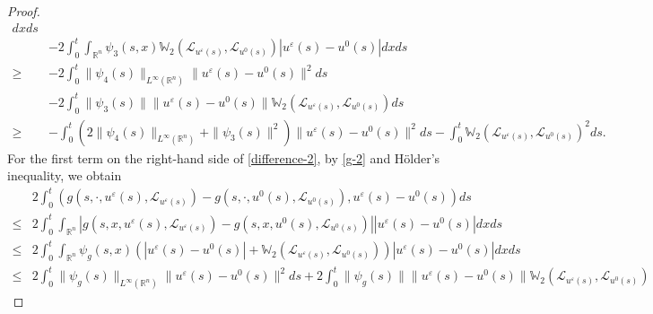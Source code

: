 \documentclass[11pt]{article}
\numberwithin{equation}{section}
\theoremstyle{plain}
\def\geq{\geqslant}
\def\leq{\leqslant}
\begin{document}
\begin{proof}
\begin{align}
        dx ds
        \nonumber \\
        & -2 \int_0^t \int_{\mathbb{R}^n}
        \psi_3(s, x)
        \mathbb{W}_2
        \left(
        \mathcal{L}_{u^\varepsilon(s)},
        \mathcal{L}_{u^0(s)}
        \right)
        | u^\varepsilon(s) - u^0 (s) |
        dx ds
        \nonumber \\
        \geq & -2 \int_0^t
        \| \psi_4(s) \|_{L^\infty(\mathbb{R}^n)}
        \| u^\varepsilon(s) - u^0(s) \|^2
        ds  \nonumber \\
        & -2 \int_0^t
        \| \psi_3(s) \|
        \| u^\varepsilon(s) - u^0 (s) \|
        \mathbb{W}_2
        \left(
        \mathcal{L}_{u^\varepsilon(s)},
        \mathcal{L}_{u^0(s)}
        \right)
        ds  \nonumber \\
        \geq & - \int_0^t
        \left( 2 \| \psi_4(s) \|_{L^\infty(\mathbb{R}^n)}
        + \| \psi_3(s) \|^2
        \right)
        \| u^\varepsilon(s) - u^0(s) \|^2
        ds
        - \int_0^t
        \mathbb{W}_2
        \left(
        \mathcal{L}_{u^\varepsilon(s)},
        \mathcal{L}_{u^0(s)}
        \right)^2
        ds.
    \end{align}
    For the first term on the right-hand side of \eqref{difference-2},
    by \eqref{g-2} and H\"{o}lder's inequality, we obtain
    \begin{align} \label{difference-4}
        & 2 \int_0^t
        \left( g(s, \cdot, u^\varepsilon(s), \mathcal{L}_{u^\varepsilon (s)} )
        - g(s, \cdot, u^0(s), \mathcal{L}_{u^0(s)} ),
        u^\varepsilon(s) - u^0 (s)
        \right) ds
        \nonumber \\
        \leq & 2 \int_0^t \int_{\mathbb{R}^n}
        \left| g(s, x, u^\varepsilon(s), \mathcal{L}_{u^\varepsilon (s)} )
        - g(s, x, u^0(s), \mathcal{L}_{u^0(s)} )
        \right|
        | u^\varepsilon(s) - u^0 (s) |
        dx ds \nonumber \\
        \leq & 2 \int_0^t \int_{\mathbb{R}^n}
        \psi_g(s, x)
        \left(  | u^\varepsilon(s) - u^0(s) |
        + \mathbb{W}_2 \left( \mathcal{L}_{u^\varepsilon(s)}, \mathcal{L}_{u^0(s)} \right)
        \right)
        | u^\varepsilon(s) - u^0 (s) |
        dx ds \nonumber \\
        \leq & 2 \int_0^t
        \|\psi_g(s)\|_{L^\infty(\mathbb{R}^n)}
        \| u^\varepsilon(s) - u^0(s) \|^2
        ds
        + 2 \int_0^t
        \| \psi_g(s) \|
        \| u^\varepsilon(s) - u^0 (s) \|
        \mathbb{W}_2 \left( \mathcal{L}_{u^\varepsilon(s)}, \mathcal{L}_{u^0(s)} \right)

\end{align}
\end{proof}
\end{document}
